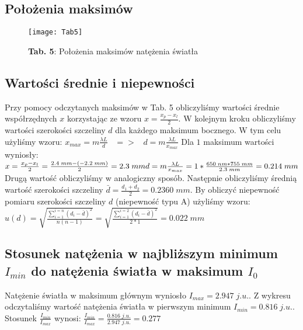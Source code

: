 \documentclass[12pt]{article}
\begin{document}
\subsection{Położenia maksimów}
\begin{figure}[H]
\centering
\texttt{[image: Tab5]}
\caption*{\textbf{Tab. 5}: Położenia maksimów natężenia światła}
\end{figure}
\subsection{Wartości średnie i niepewności}
Przy pomocy odczytanych maksimów w Tab. 5 obliczyliśmy wartości średnie współrzędnych $x$ korzystając ze wzoru $x=\frac{x_p-x_l}{2}$. W kolejnym kroku obliczyliśmy wartości szerokości szczeliny $d$ dla każdego maksimum bocznego. W tym celu użyliśmy wzoru: \newline \newline
{\Large $x_{max}=m\frac{\lambda{L}}{d}\;\;\;=>\;\;\;d=m\frac{\lambda{L}}{x_{max}}$} \newline \newline
Dla $1$ maksimum wartości wyniosły: \newline \newline
{\Large $ x=\frac{x_p-x_l}{2}=\frac{2.4\;mm-(-2.2\;mm)}{2}=2.3\;mm \newline
d=m\frac{\lambda{L}}{x_{max}}=1*\frac{650\;nm*755\;mm}{2.3\;mm}=0.214\;mm$} \newline \newline
Drugą wartość obliczyliśmy w analogiczny sposób. 
Następnie obliczyliśmy średnią wartość szerokości szczeliny $\bar{d}=\frac{d_1+d_2}{2}=0.2360\;mm$. By obliczyć niepewność pomiaru szerokości szczeliny $d$ (niepewność typu A) użyliśmy wzoru: \newline \newline
{\Large $u(d)=\sqrt{\frac{\sum_{i=1}^{i=n} (d_i-\bar{d})^2}{n(n-1)}}=\sqrt{\frac{\sum_{i=1}^{i=2} (d_i-\bar{d})^2}{2*1}}=0.022\;mm$}
\subsection{Stosunek natężenia w najbliższym minimum $I_{min}$ do natężenia światła w maksimum $I_0$}
Natężenie światła w maksimum głównym wyniosło $I_{max}=2.947\;j. u.$. Z wykresu odczytaliśmy wartość natężenia światła w pierwszym minimum $I_{min}=0.816\;j. u.$. Stosunek 
$\frac{I_{min}}{I_{max}}$ wynosi: \newline
{\Large $\frac{I_{min}}{I_{max}}=\frac{0.816\;j. u.}{2.947\;j. u.}= 0.277$} \newpage
\end{document}
